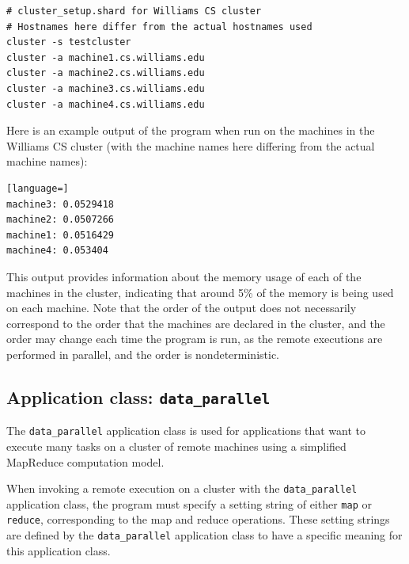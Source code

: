 \documentclass[twoside]{report}
\begin{document}
\begin{minipage}[c]{\textwidth-15pt}
  \begin{lstlisting}[language=Shard]
# cluster_setup.shard for Williams CS cluster 
# Hostnames here differ from the actual hostnames used
cluster -s testcluster
cluster -a machine1.cs.williams.edu
cluster -a machine2.cs.williams.edu
cluster -a machine3.cs.williams.edu
cluster -a machine4.cs.williams.edu
\end{lstlisting}
  \smallskip
\end{minipage}

Here is an example output of the program when run on the machines in the Williams CS cluster (with the machine names here differing from the actual machine names):

\begin{minipage}[c]{\textwidth-15pt}
  \begin{lstlisting}[language=]
machine3: 0.0529418
machine2: 0.0507266
machine1: 0.0516429
machine4: 0.053404
\end{lstlisting}
  \smallskip
\end{minipage}

This output provides information about the memory usage of each of the machines in the cluster, indicating that around 5\% of the memory is being used on each machine.
Note that the order of the output does not necessarily correspond to the order that the machines are declared in the cluster, and the order may change each time the program is run, as the remote executions are performed in parallel, and the order is nondeterministic.

\subsection{Application class: \texttt{data\_parallel}}

The \texttt{data\_parallel} application class is used for applications that want to execute many tasks on a cluster of remote machines using a simplified MapReduce computation model.

When invoking a remote execution on a cluster with the \texttt{data\_parallel} application class, the program must specify a setting string of either \texttt{map} or \texttt{reduce}, corresponding to the map and reduce operations.
These setting strings are defined by the \texttt{data\_parallel} application class to have a specific meaning for this application class.
\end{document}
